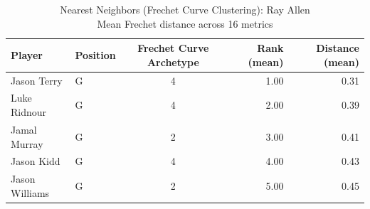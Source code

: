 \begin{table}[t]
\caption*{
{\fontsize{20}{25} Nearest Neighbors (Frechet Curve Clustering): Ray Allen\fontsize{12}{15}\selectfont } \\ 
{\fontsize{14}{17}\selectfont  Mean Frechet distance across 16 metrics\fontsize{12}{15}\selectfont }
} 
\fontsize{12.0pt}{14.0pt}\selectfont
\begin{tabular*}{\linewidth}{@{\extracolsep{\fill}}llcrr}
\toprule
Player & Position & Frechet Curve Archetype & Rank (mean) & Distance (mean) \\ 
\midrule\addlinespace[2.5pt]
Jason Terry & G & 4 & 1.00 & 0.31 \\ 
Luke Ridnour & G & 4 & 2.00 & 0.39 \\ 
Jamal Murray & G & 2 & 3.00 & 0.41 \\ 
Jason Kidd & G & 4 & 4.00 & 0.43 \\ 
Jason Williams & G & 2 & 5.00 & 0.45 \\ 
\bottomrule
\end{tabular*}
\end{table}

